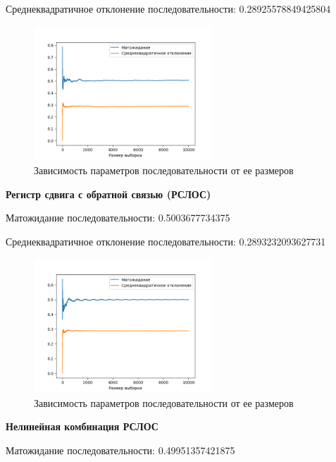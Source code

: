\documentclass[spec, och, labwork]{shiza}
\begin{document}
\begin{enumerate}
  Среднеквадратичное отклонение последовательности: 0.28925578849425804
  \begin{figure}[H]
    \centering
    \includegraphics[width=0.6\textwidth]{pic/5p}
    \caption{Зависимость параметров последовательности от ее размеров}
    \label{fig:img1}
  \end{figure}
  \begin{center}
    \textbf{Регистр сдвига с обратной связью (РСЛОС)}
  \end{center}
  Матожидание последовательности: 0.5003677734375

  Среднеквадратичное отклонение последовательности: 0.2893232093627731
  \begin{figure}[H]
    \centering
    \includegraphics[width=0.6\textwidth]{pic/lfsr}
    \caption{Зависимость параметров последовательности от ее размеров}
    \label{fig:img1}
  \end{figure}
  \begin{center}
    \textbf{Нелинейная комбинация РСЛОС}
  \end{center}
  Матожидание последовательности: 0.49951357421875


\end{enumerate}
\end{document}
